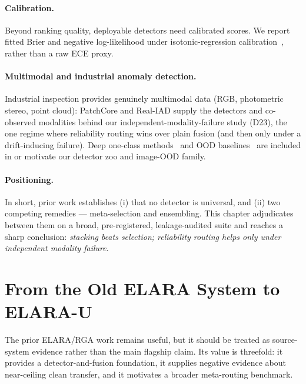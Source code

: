 \documentclass[11pt,titlepage]{article}
\newcommand{\system}{ELARA}
\newcommand{\method}{RGA}
\begin{document}
\paragraph{Calibration.} Beyond ranking quality, deployable detectors need calibrated
scores. We report fitted Brier and negative log-likelihood under
isotonic-regression calibration~\cite{guo2017calibration}, rather than a raw ECE proxy.

\paragraph{Multimodal and industrial anomaly detection.} Industrial inspection
provides genuinely multimodal data (RGB, photometric stereo, point cloud): PatchCore
\cite{roth2022patchcore} and Real-IAD supply the detectors and co-observed modalities
behind our independent-modality-failure study (D23), the one regime where reliability
routing wins over plain fusion (and then only under a drift-inducing failure). Deep one-class methods~\cite{bergman2020classification} and
OOD baselines~\cite{hendrycks2017baseline} are included in or motivate our detector
zoo and image-OOD family.

\paragraph{Positioning.} In short, prior work establishes (i) that no detector is
universal, and (ii) two competing remedies --- meta-selection and ensembling. This
chapter adjudicates between them on a broad, pre-registered, leakage-audited suite and
reaches a sharp conclusion: \emph{stacking beats selection; reliability routing helps
only under independent modality failure}.

\section{From the Old ELARA System to ELARA-U}

The prior \system{}/\method{} work remains useful, but it should be treated as
source-system evidence rather than the main flagship claim. Its value is threefold:
it provides a detector-and-fusion foundation, it supplies negative evidence about
near-ceiling clean transfer, and it motivates a broader meta-routing benchmark.
\end{document}
